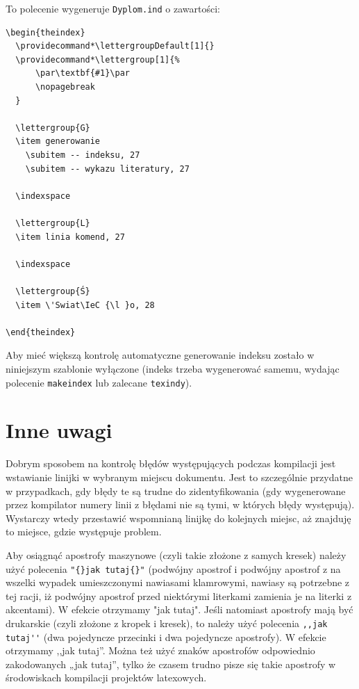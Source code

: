 \begin{itemize}
To polecenie wygeneruje \texttt{Dyplom.ind} o zawartości:
\begin{lstlisting}[basicstyle=\footnotesize\ttfamily]
\begin{theindex}
  \providecommand*\lettergroupDefault[1]{}
  \providecommand*\lettergroup[1]{%
      \par\textbf{#1}\par
      \nopagebreak
  }

  \lettergroup{G}
  \item generowanie
    \subitem -- indeksu, 27
    \subitem -- wykazu literatury, 27

  \indexspace

  \lettergroup{L}
  \item linia komend, 27

  \indexspace

  \lettergroup{Ś}
  \item \'Swiat\IeC {\l }o, 28

\end{theindex}
\end{lstlisting}


\end{itemize}


Aby mieć większą kontrolę automatyczne generowanie indeksu zostało w niniejszym szablonie wyłączone (indeks trzeba wygenerować samemu, wydając polecenie \texttt{makeindex} lub zalecane \texttt{texindy}).

\section{Inne uwagi}
Dobrym sposobem na kontrolę błędów występujących podczas kompilacji jest wstawianie linijki \verb?? w wybranym miejscu dokumentu. Jest to szczególnie przydatne w przypadkach, gdy błędy te są trudne do zidentyfikowania (gdy wygenerowane przez kompilator numery linii z błędami nie są tymi, w których błędy występują). Wystarczy wtedy przestawić wspomnianą linijkę do kolejnych miejsc, aż znajduję to miejsce, gdzie występuje problem.

Aby osiągnąć apostrofy maszynowe (czyli takie złożone z samych kresek) należy użyć polecenia \verb?"{}jak tutaj{}"? (podwójny apostrof i podwójny apostrof z na wszelki wypadek umieszczonymi nawiasami klamrowymi, nawiasy są potrzebne z tej racji, iż podwójny apostrof przed niektórymi literkami zamienia je na literki z akcentami). W efekcie otrzymamy "{}jak tutaj{}". Jeśli natomiast apostrofy mają być drukarskie (czyli złożone z kropek i kresek), to należy użyć polecenia \verb?,,jak tutaj''? (dwa pojedyncze przecinki i dwa pojedyncze apostrofy). W efekcie otrzymamy ,,jak tutaj''. Można też użyć znaków apostrofów odpowiednio zakodowanych „jak tutaj”, tylko że czasem trudno pisze się takie apostrofy w środowiskach kompilacji projektów latexowych.



